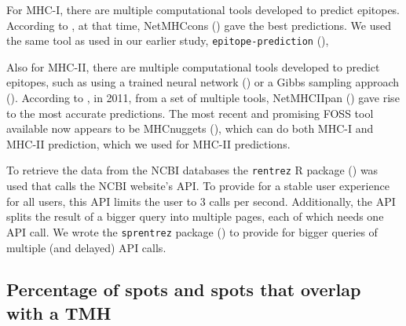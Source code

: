 
For MHC-I, there are multiple computational tools developed 
to predict epitopes. 
According to \cite{lundegaard2011prediction}, at that time,
NetMHCcons (\cite{karosiene2012netmhccons}) gave the best predictions.
We used the same tool as used in our earlier study, \verb;epitope-prediction; (\cite{bianchi2017}),


Also for MHC-II, there are multiple computational tools developed 
to predict epitopes,
such as using a trained neural network (\cite{nielsen2003reliable})
or a Gibbs sampling approach (\cite{nielsen2004improved}).
According to \cite{lundegaard2011prediction}, in 2011,
from a set of multiple tools, 
NetMHCIIpan (\cite{nielsen2008quantitative,karosiene2013netmhciipan})
gave rise to the most accurate predictions.
The most recent and promising FOSS tool available now appears
to be MHCnuggets (\cite{shao2020high}), which can do both MHC-I 
and MHC-II prediction, which we used for MHC-II predictions.


To retrieve the data from the NCBI databases the
\verb;rentrez; R package (\cite{rentrez}) was used
that calls the NCBI website's API. To provide for a 
stable user experience for all users, 
this API limits the user to 3 calls per second.
Additionally, the API splits the result of a bigger
query into multiple pages, each of which needs one API call.
We wrote the \verb;sprentrez; package (\cite{sprentrez}) to provide for 
bigger queries of multiple (and delayed) API calls.

\subsection{Percentage of spots and spots that overlap with a TMH}

